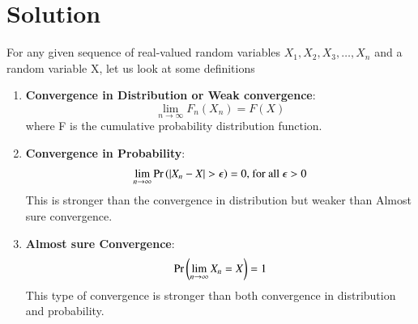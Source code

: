 \documentclass[journal,12pt,twocolumn]{IEEEtran}
\begin{document}
\section{\textbf{Solution}}
For any given sequence of real-valued random variables $X_1,X_2,X_3, \dots ,X_n$ and a random variable X, let us look at some definitions
\begin{enumerate}
    \item \textbf{Convergence in Distribution or Weak convergence}:
\begin{equation}
    \lim_{n \rightarrow \infty} F_n(X_n) = F(X)
\end{equation}
where F is the cumulative probability distribution function.
\item \textbf{Convergence in Probability}:
\begin{align}
    \lim_{n \rightarrow \infty} \Pr\left(|X_n - X| > \epsilon\right) = 0 \text{, for all } \epsilon > 0
\end{align}
This is stronger than the convergence in distribution but weaker than Almost sure convergence.
\item \textbf{Almost sure Convergence}:
\begin{align}
  \Pr\left(\lim_{n \rightarrow \infty} X_n = X\right) = 1  
\end{align}
This type of convergence is stronger than both convergence in distribution and probability.
\end{enumerate}
\end{document}
